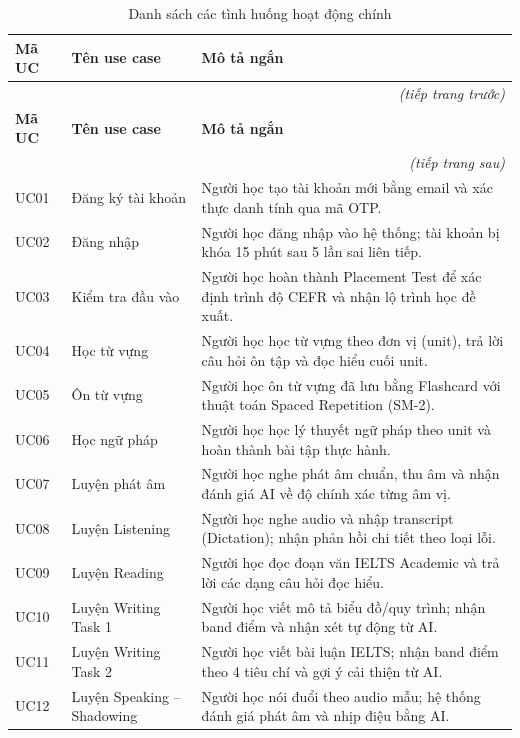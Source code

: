 \documentclass[a4paper,12pt]{extreport}
\begin{document}
\renewcommand{\arraystretch}{1.2}
\begin{longtable}{|p{1.5cm}|p{4.5cm}|p{8.0cm}|}
    \caption{Danh sách các tình huống hoạt động chính}
    \label{tab:uc_list} \\
    \hline
    \textbf{Mã UC} & \textbf{Tên use case} & \textbf{Mô tả ngắn} \\ \hline
    \endfirsthead
    \multicolumn{3}{r}{\textit{(tiếp trang trước)}} \\
    \hline
    \textbf{Mã UC} & \textbf{Tên use case} & \textbf{Mô tả ngắn} \\ \hline
    \endhead
    \hline \multicolumn{3}{r}{\textit{(tiếp trang sau)}} \\
    \endfoot
    \hline
    \endlastfoot
    UC01 & Đăng ký tài khoản & Người học tạo tài khoản mới bằng email và xác thực danh tính qua mã OTP. \\ \hline
    UC02 & Đăng nhập & Người học đăng nhập vào hệ thống; tài khoản bị khóa 15 phút sau 5 lần sai liên tiếp. \\ \hline
    UC03 & Kiểm tra đầu vào & Người học hoàn thành Placement Test để xác định trình độ CEFR và nhận lộ trình học đề xuất. \\ \hline
    UC04 & Học từ vựng & Người học học từ vựng theo đơn vị (unit), trả lời câu hỏi ôn tập và đọc hiểu cuối unit. \\ \hline
    UC05 & Ôn từ vựng & Người học ôn từ vựng đã lưu bằng Flashcard với thuật toán Spaced Repetition (SM-2). \\ \hline
    UC06 & Học ngữ pháp & Người học học lý thuyết ngữ pháp theo unit và hoàn thành bài tập thực hành. \\ \hline
    UC07 & Luyện phát âm & Người học nghe phát âm chuẩn, thu âm và nhận đánh giá AI về độ chính xác từng âm vị. \\ \hline
    UC08 & Luyện Listening & Người học nghe audio và nhập transcript (Dictation); nhận phản hồi chi tiết theo loại lỗi. \\ \hline
    UC09 & Luyện Reading & Người học đọc đoạn văn IELTS Academic và trả lời các dạng câu hỏi đọc hiểu. \\ \hline
    UC10 & Luyện Writing Task 1 & Người học viết mô tả biểu đồ/quy trình; nhận band điểm và nhận xét tự động từ AI. \\ \hline
    UC11 & Luyện Writing Task 2 & Người học viết bài luận IELTS; nhận band điểm theo 4 tiêu chí và gợi ý cải thiện từ AI. \\ \hline
    UC12 & Luyện Speaking -- Shadowing & Người học nói đuổi theo audio mẫu; hệ thống đánh giá phát âm và nhịp điệu bằng AI. \\ \hline

\end{longtable}
\end{document}
